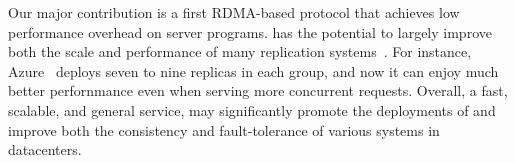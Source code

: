 Our major contribution is a first RDMA-based \paxos protocol that achieves  
low performance overhead on server programs. \xxx has the potential to largely 
improve both the scale and performance of many replication 
systems~\cite{scatter:sosp11,manos:hotdep10,crane:sosp15,rex:eurosys14, 
ssmr:dsn14,spaxos:srds12}. For instance, Azure~\cite{azure:book} 
deploys seven to nine replicas in each \paxos group, and now it can enjoy much  
better perfornmance even when serving more concurrent requests. 
Overall, a fast, scalable, and general service, \xxx may significantly promote 
the deployments of \paxos and improve both the consistency and 
fault-tolerance of various systems in datacenters.




